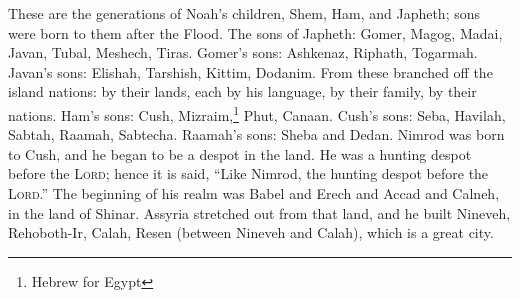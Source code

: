 
\begin{inparaenum}
     These are the generations of Noah's children, Shem, Ham, and Japheth; sons were born to them after the Flood.%
     The sons of Japheth: Gomer, Magog, Madai, Javan, Tubal, Meshech, Tiras.%
     Gomer's sons: Ashkenaz, Riphath, Togarmah.%
     Javan's sons: Elishah, Tarshish, Kittim, Dodanim.%
     From these branched off the island nations: by their lands, each by his language, by their family, by their nations.%
     Ham's sons: Cush, Mizraim,\footnote{Hebrew for Egypt} Phut, Canaan.%
     Cush's sons: Seba, Havilah, Sabtah, Raamah, Sabtecha. Raamah's sons: Sheba and Dedan.%
     Nimrod was born to Cush, and he began to be a despot in the land.%
     He was a hunting despot before the \textsc{Lord}; hence it is said, ``Like Nimrod, the hunting despot before the \textsc{Lord}.''%
     The beginning of his realm was Babel and Erech and Accad and Calneh, in the land of Shinar.%
     Assyria stretched out from that land, and he built Nineveh, Rehoboth-Ir, Calah,%
     Resen (between Nineveh and Calah), which is a great city.%
    
    
\end{inparaenum}
